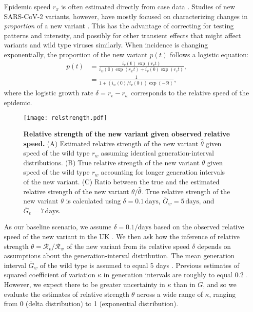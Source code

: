 \documentclass[12pt]{article}
\newcommand{\RR}{\ensuremath{{\mathcal R}}\xspace}
\begin{document}
Epidemic speed $r_x$ is often estimated directly from case data \citep{mills2004transmissibility,nishiura2009transmission,ma2014estimating}.
Studies of new SARS-CoV-2 variants, however, have mostly focused on characterizing changes in \emph{proportion} of a new variant \citep{switzerland2021variant, davies2021estimated, di2021impact, leung2021early, volz2021transmission,zhao2021}.
This has the advantage of correcting for testing patterns and intensity, and possibly for other transient effects that might affect variants and wild type viruses similarly.
When incidence is changing exponentially, the proportion of the new variant $p(t)$ follows a logistic equation:
\begin{align}
p(t) &= \frac{i_v(0) \exp(r_v t)}{i_w(0) \exp(r_w t) + i_v(0) \exp(r_v t)},
\\ &= \frac{1}{1 + \left(i_w(0)/i_v(0)\right) \exp(-\delta t)},
\end{align}
where the logistic growth rate $\delta = r_v - r_w$ corresponds to the relative speed of the epidemic.

\begin{figure}[!th]
\texttt{[image: relstrength.pdf]}
\caption{
\textbf{Relative strength of the new variant given observed relative speed.}
(A) Estimated relative strength of the new variant $\hat{\theta}$ given speed of the wild type
$r_w$ assuming identical generation-interval distributions.
(B) True relative strength of the new variant $\theta$ given speed of the wild type $r_w$ accounting for longer generation intervals of the new variant.
(C) Ratio between the true and the estimated relative strength of the new variant $\theta/\hat{\theta}$.
True relative strength of the new variant $\theta$ is calculated using $\delta=0.1\,\textrm{days}$, $\bar{G}_w = 5\,\textrm{days}$, and $\bar{G}_v = 7\,\textrm{days}$.
}
\label{fig:relstrength}
\end{figure}

As our baseline scenario, we assume $\delta = 0.1/\textrm{days}$ based on the observed relative speed of the new variant in the UK \citep{davies2021estimated}.
We then ask how the inference of relative strength $\theta = \RR_v/\RR_w$ of the new variant from its relative speed $\delta$ depends on assumptions about the generation-interval distribution.
The mean generation interval $\bar{G}_w$ of the wild type is assumed to equal 5 days \citep{ferretti2020quantifying}.
Previous estimates of squared coefficient of variation $\kappa$ in generation intervals are roughly to equal 0.2 \citep{ferretti2020quantifying}.
However, we expect there to be greater uncertainty in $\kappa$ than in $\bar{G}$, and so we evaluate the estimates of relative strength $\theta$ across a wide range of $\kappa$, ranging from 0 (delta distribution) to 1 (exponential distribution).
\end{document}
